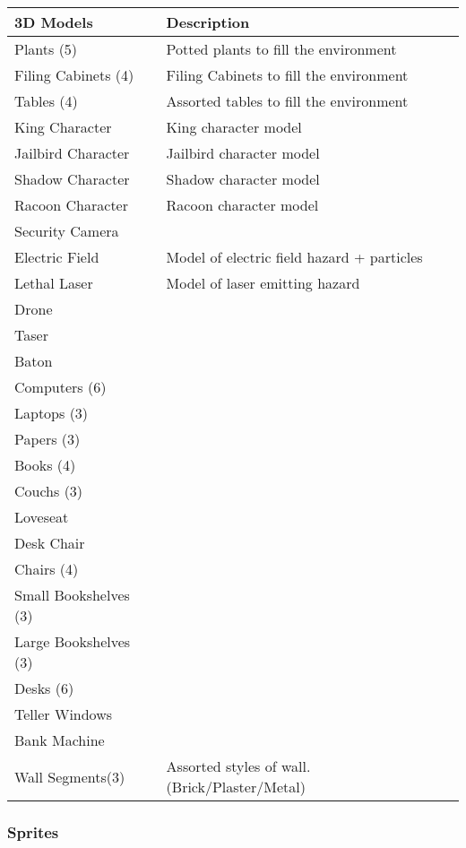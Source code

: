 \documentclass[14pt]{report}
\begin{document}
\begin{tabular}{| p{.4\linewidth} | p{.4\linewidth} |}
    \hline    
    3D Models   & Description  \\ \hline
    Plants (5)  &   Potted plants to fill the environment \\ \hline
    Filing Cabinets (4) &  Filing Cabinets to fill the environment \\ \hline
    Tables (4)  &  Assorted tables to fill the environment \\ \hline
    King Character  &  King character model \\ \hline
    Jailbird Character  &  Jailbird character model \\ \hline
    Shadow Character    &  Shadow character model \\ \hline
    Racoon Character    &  Racoon character model \\ \hline
    Security Camera &   \\ \hline
    Electric Field  &  Model of electric field hazard + particles \\ \hline
    Lethal Laser    &  Model of laser emitting hazard \\ \hline
    Drone   &  \\ \hline
    Taser   &  \\ \hline
    Baton   &  \\ \hline
    Computers (6)   &  \\ \hline
    Laptops (3) &  \\ \hline
    Papers (3)  &  \\ \hline
    Books (4)   &  \\ \hline
    Couchs (3)  &  \\ \hline
    Loveseat    &  \\ \hline
    Desk Chair  &  \\ \hline
    Chairs (4)  &  \\ \hline
    Small Bookshelves (3)   &  \\ \hline
    Large Bookshelves (3)   &  \\ \hline
    Desks (6)   &  \\ \hline
    Teller Windows  &  \\ \hline
    Bank Machine    &  \\ \hline
    Wall Segments(3)    & Assorted styles of wall. (Brick/Plaster/Metal) \\
    \hline
\end{tabular}

\subsubsection{Sprites}
\end{document}
